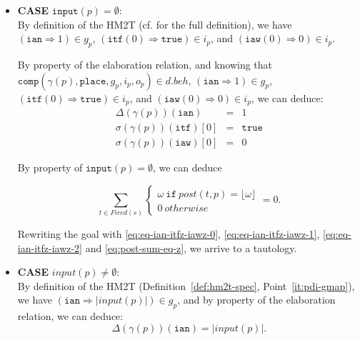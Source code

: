 \begin{itemize}
\item \textbf{CASE} $\mathtt{input}(p)=\emptyset$:\\
  
  By definition of the HM2T (cf. \cite{Iampietro2022hfspec} for the
  full definition), we have $(\mathtt{ian}\Rightarrow{}1)\in{}g_p$,
  $(\mathtt{itf}(0)\Rightarrow{}\mathtt{true})\in{}i_p$, and
  $(\mathtt{iaw}(0)\Rightarrow{}0)\in{}i_p$.

  By property of the elaboration relation, and knowing that
  $\mathtt{comp}(\gamma(p),\mathtt{place},g_p,i_p,o_p)\in{}d.beh$,
  $(\mathtt{ian}\Rightarrow{}1)\in{}g_p$,
  $(\mathtt{itf}(0)\Rightarrow{}\mathtt{true})\in{}i_p$, and
  $(\mathtt{iaw}(0)\Rightarrow{}0)\in{}i_p$, we can deduce:
  \begin{eqnarray}
    \label{eq:eq-ian-itfz-iawz-0}
    \Delta(\gamma(p))(\texttt{ian})&=&1 \\
    \label{eq:eq-ian-itfz-iawz-1}\sigma(\gamma(p))(\texttt{itf})[0]&=&\mathtt{true} \\
    \label{eq:eq-ian-itfz-iawz-2}\sigma(\gamma(p))(\texttt{iaw})[0]&=&0
  \end{eqnarray}

  By property of $\mathtt{input}(p)=\emptyset$, we can deduce
  
  \begin{equation}
    \sum\limits_{t\in{}Fired(s)}
    \begin{cases}
      \omega~\mathtt{if}~post(t,p)=\lfloor\omega\rfloor \\
      0~otherwise
    \end{cases}=0.
    \label{eq:post-sum-eq-z}    
  \end{equation}

  \noindent{}Rewriting the goal with \eqref{eq:eq-ian-itfz-iawz-0},
  \eqref{eq:eq-ian-itfz-iawz-1}, \eqref{eq:eq-ian-itfz-iawz-2} and
  \eqref{eq:post-sum-eq-z}, we arrive to a tautology.\\
  
\item \textbf{CASE} $input(p)\neq\emptyset$:\\

  By definition of the HM2T (Definition~\ref{def:hm2t-spec},
  Point~\ref{it:pdi-gmap}), we have
  $(\mathtt{ian}\Rightarrow{}\vert{}input(p)\vert)\in{}g_p$, and by
  property of the elaboration relation, we can deduce:
  \begin{equation}
    \Delta(\gamma(p))(\texttt{ian})=\vert{}input(p)\vert.\label{eq:ian-eq-input-card}
  \end{equation}


\end{itemize}
